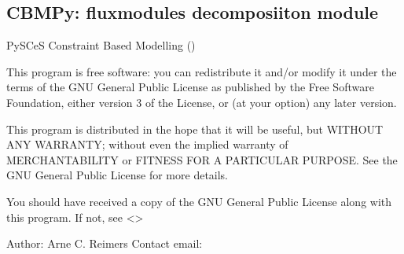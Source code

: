 \documentclass[letterpaper,12pt,english]{sphinxmanual}
\begin{document}
\subsection{CBMPy: fluxmodules decomposiiton module}
\label{\detokenize{api/modules:cbmpy-fluxmodules-decomposiiton-module}}\label{\detokenize{api/modules:module-cbmpy.fluxmodules.decomposition}}
\sphinxAtStartPar
PySCeS Constraint Based Modelling ()

\sphinxAtStartPar
This program is free software: you can redistribute it and/or modify
it under the terms of the GNU General Public License as published by
the Free Software Foundation, either version 3 of the License, or
(at your option) any later version.

\sphinxAtStartPar
This program is distributed in the hope that it will be useful,
but WITHOUT ANY WARRANTY; without even the implied warranty of
MERCHANTABILITY or FITNESS FOR A PARTICULAR PURPOSE.  See the
GNU General Public License for more details.

\sphinxAtStartPar
You should have received a copy of the GNU General Public License
along with this program.  If not, see \textless{}\textgreater{}

\sphinxAtStartPar
Author: Arne C. Reimers
Contact email: 
\end{document}
